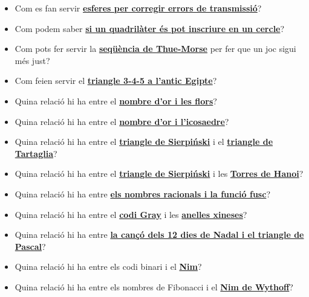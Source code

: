 \documentclass[a4paper, 12pt]{article}
\begin{document}
\begin{itemize}
            \item Com es fan servir \href{https://ca.wikipedia.org/wiki/Codi_perfecte}{\textbf{esferes per corregir errors de transmissió}}?
            \item Com podem saber \href{https://ca.wikipedia.org/wiki/Quadril\%C3\%A0ter_c\%C3\%ADclic}{\textbf{si un quadrilàter és pot inscriure en un cercle}}?
            \item Com pots fer servir la \href{https://en.wikipedia.org/wiki/Thue\%E2\%80\%93Morse_sequence#Equitable_sequencing}{\textbf{seqüència de Thue-Morse}} per fer que un joc sigui més just?
            \item Com feien servir el \href{https://en.wikipedia.org/wiki/Rope_stretcher}{\textbf{triangle 3-4-5 a l'antic Egipte}}?
            \item Quina relació hi ha entre el \href{https://en.wikipedia.org/wiki/Golden_angle}{\textbf{nombre d'or i les flors}}?
            \item Quina relació hi ha entre el \href{https://ca.wikipedia.org/wiki/Icosaedre#Coordenades_cartesianes}{\textbf{nombre d'or i l'icosaedre}}?
            \item Quina relació hi ha entre el \href{https://ca.wikipedia.org/wiki/Triangle_de_Sierpi\%C5\%84ski}{\textbf{triangle de Sierpiński}} i el \href{https://ca.wikipedia.org/wiki/Triangle_de_Tartaglia}{\textbf{triangle de Tartaglia}}?
            \item Quina relació hi ha entre el \href{https://ca.wikipedia.org/wiki/Triangle_de_Sierpi\%C5\%84ski}{\textbf{triangle de Sierpiński}} i les \href{https://ca.wikipedia.org/wiki/Torres_de_Hanoi}{\textbf{Torres de Hanoi}}?
            \item Quina relació hi ha entre \href{https://en.wikipedia.org/wiki/Calkin\%E2\%80\%93Wilf_tree#Stern's_diatomic_sequence}{\textbf{els nombres racionals i la funció fusc}}?
            \item Quina relació hi ha entre el \href{https://ca.wikipedia.org/wiki/Codi_Gray}{\textbf{codi Gray}} i les \href{https://en.wikipedia.org/wiki/Baguenaudier}{\textbf{anelles xineses}}?
            \item Quina relació hi ha entre \href{https://en.wikipedia.org/wiki/Tetrahedral_number}{\textbf{la cançó dels 12 dies de Nadal i el triangle de Pascal}}?
            \item Quina relació hi ha entre els codi binari i el \href{https://en.wikipedia.org/wiki/Nim}{\textbf{Nim}}?
            \item Quina relació hi ha entre els nombres de Fibonacci i el \href{https://en.wikipedia.org/wiki/Wythoff\%27s_game}{\textbf{Nim de Wythoff}}?

\end{itemize}
\end{document}
